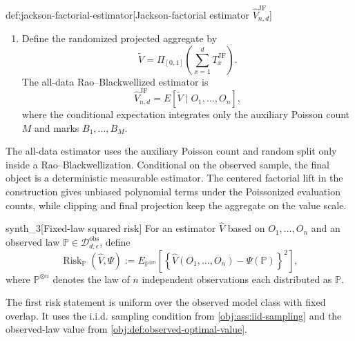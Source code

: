 \begin{algorithmv}{def:jackson-factorial-estimator}[Jackson-factorial estimator \(\widehat V_{n,d}^{\mathrm{JF}}\)]
\begin{enumerate}
\item Define the randomized projected aggregate by
\[
\widetilde V
=
\Pi_{[0,1]}
\left(
\sum_{x=1}^d T_x^{\mathrm{JF}}
\right).
\]
The all-data Rao--Blackwellized estimator is
\[
\widehat V_{n,d}^{\mathrm{JF}}
=
E\!\left[
\widetilde V
\mid
O_1,\ldots,O_n
\right],
\]
where the conditional expectation integrates only the auxiliary Poisson count \(M\) and marks \(B_1,\ldots,B_M\).
\end{enumerate}
\end{algorithmv}

The all-data estimator  uses the auxiliary Poisson count  and random split only inside a Rao--Blackwellization. Conditional on the observed sample, the final object is a deterministic measurable estimator. The centered factorial lift in the construction gives unbiased polynomial terms under the Poissonized evaluation counts, while clipping and final projection keep the aggregate on the value scale.

\begin{definitionv}{synth_3}[Fixed-law squared risk]
For an estimator \(\widehat V\) based on \(O_1,\ldots,O_n\) and an observed law \(\mathbb P\in\mathcal D_{d,\epsilon}^{\mathrm{obs}}\), define \[ \operatorname{Risk}_{\mathbb P}(\widehat V,\Psi):=E_{\mathbb P^{\otimes n}}\left[\left\{\widehat V(O_1,\ldots,O_n)-\Psi(\mathbb P)\right\}^2\right], \] where \(\mathbb P^{\otimes n}\) denotes the law of \(n\) independent observations each distributed as \(\mathbb P\).
\end{definitionv}

The first risk statement is uniform over the observed model class with fixed overlap. It uses the i.i.d. sampling condition from \cref{obj:ass:iid-sampling} and the observed-law value from \cref{obj:def:observed-optimal-value}.

